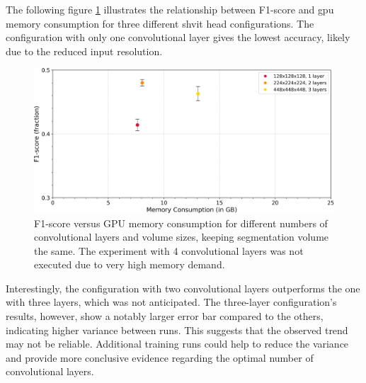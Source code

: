 The following figure \ref{iou_vs_layers_memory} illustrates the relationship between F1-score and \acrshort{gpu} memory consumption for three different \gls{shvit} head configurations. The configuration with only one convolutional layer gives the lowest accuracy, likely due to the reduced input resolution. 
\begin{figure}[H]
	\centering
	\includegraphics[width=1.0\textwidth]{./images/F1_vs_layers_memory.png}
	\caption[F1-score versus GPU memory consumption for different numbers of conv.~layers]{F1-score versus GPU memory consumption for different numbers of convolutional layers and volume sizes, keeping segmentation volume the same. The experiment with 4 convolutional layers was not executed due to very high memory demand.}
	\label{iou_vs_layers_memory}
\end{figure}
Interestingly, the configuration with two convolutional layers outperforms the one with three layers, which was not anticipated. The three-layer configuration's results, however, show a notably larger error bar compared to the others, indicating higher variance between runs. This suggests that the observed trend may not be reliable. Additional training runs could help to reduce the variance and provide more conclusive evidence regarding the optimal number of convolutional layers.



